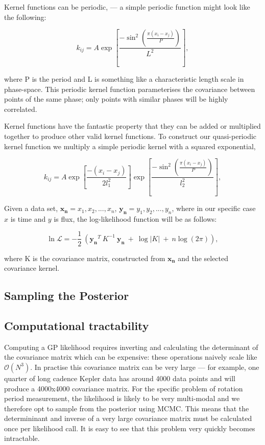 \documentclass[12pt,preprint]{aastex}
\begin{document}
Kernel functions can be periodic,  --- a simple periodic function might look like the following:

\begin{equation}
	k_{ij} = A\exp\left[{\frac{-\sin^2\left({\frac{\pi(x_i-x_j)}{P}}\right)}{L^2}}\right],
\end{equation}

where P is the period and L is something like a characteristic length scale in phase-space.
This periodic kernel function parameterises the covariance between points of the same phase; only points with similar phases will be highly correlated.

Kernel functions have the fantastic property that they can be added or multiplied together to produce other valid kernel functions.
To construct our quasi-periodic kernel function we multiply a simple periodic kernel with a squared exponential,

\begin{equation}
	k_{ij} = A\exp\left[{\frac{-(x_i-x_j)}{2l_1^2}}\right]\exp\left[\frac{-\sin^2\left(\frac{\pi(x_i-x_j)}{P}\right)}{l_2^2}\right],
\end{equation}

Given a data set, $\mathbf{x_n} = {x_1, x_2, ..., x_n}$, $\mathbf{y_n} = {y_1, y_2, ..., y_n}$, where in our specific case $x$ is time and $y$ is flux, the log-likelihood function will be as follows:

\begin{equation}
	\ln{\mathcal{L}} = -\frac{1}{2}~\left(\mathbf{y_n}^T~K^{-1}~\mathbf{y_n}~ + ~\log{|K| ~+~ n\log(2\pi)} \right),
\end{equation}

where K is the covariance matrix, constructed from $\mathbf{x_n}$ and the selected covariance kernel.

\subsection{Sampling the Posterior}

\subsection{Computational tractability}

Computing a GP likelihood requires inverting and calculating the determinant of the covariance matrix which can be expensive:
these operations naively scale like $\mathcal{O}(N^3)$.
In practise this covariance matrix can be very large --- for example, one quarter of long cadence Kepler data has around 4000 data points and will produce a 4000x4000 covariance matrix.
For the specific problem of rotation period measurement, the likelihood is likely to be very multi-modal and we therefore opt to sample from the posterior using MCMC.
This means that the determininant and inverse of a very large covariance matrix must be calculated once per likelihood call.
It is easy to see that this problem very quickly becomes intractable.
\end{document}
